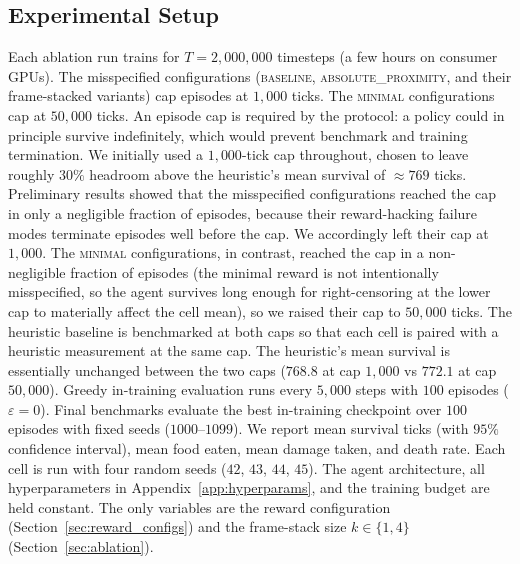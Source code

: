 \documentclass[12pt,a4paper,titlepage]{article}
\begin{document}
\subsection{Experimental Setup}
\label{sec:setup}

Each ablation run trains for $T = 2{,}000{,}000$ timesteps (a few hours on consumer GPUs). The misspecified configurations (\textsc{baseline}, \textsc{absolute\_proximity}, and their frame-stacked variants) cap episodes at $1{,}000$ ticks. The \textsc{minimal} configurations cap at $50{,}000$ ticks. An episode cap is required by the protocol: a policy could in principle survive indefinitely, which would prevent benchmark and training termination. We initially used a $1{,}000$-tick cap throughout, chosen to leave roughly $30\%$ headroom above the heuristic's mean survival of $\approx 769$ ticks. Preliminary results showed that the misspecified configurations reached the cap in only a negligible fraction of episodes, because their reward-hacking failure modes terminate episodes well before the cap. We accordingly left their cap at $1{,}000$. The \textsc{minimal} configurations, in contrast, reached the cap in a non-negligible fraction of episodes (the minimal reward is not intentionally misspecified, so the agent survives long enough for right-censoring at the lower cap to materially affect the cell mean), so we raised their cap to $50{,}000$ ticks. The heuristic baseline is benchmarked at both caps so that each cell is paired with a heuristic measurement at the same cap. The heuristic's mean survival is essentially unchanged between the two caps ($768.8$ at cap $1{,}000$ vs $772.1$ at cap $50{,}000$). Greedy in-training evaluation runs every $5{,}000$ steps with $100$ episodes ($\varepsilon = 0$). Final benchmarks evaluate the best in-training checkpoint over $100$ episodes with fixed seeds ($1000$--$1099$). We report mean survival ticks (with $95\%$ confidence interval), mean food eaten, mean damage taken, and death rate. Each cell is run with four random seeds ($42$, $43$, $44$, $45$). The agent architecture, all hyperparameters in Appendix~\ref{app:hyperparams}, and the training budget are held constant. The only variables are the reward configuration (Section~\ref{sec:reward_configs}) and the frame-stack size $k \in \{1, 4\}$ (Section~\ref{sec:ablation}).
\end{document}
